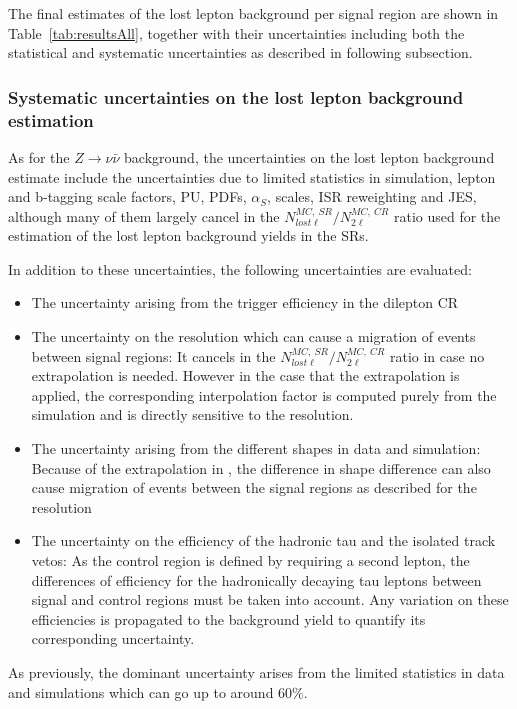 The final estimates of the lost lepton background per signal region are shown in Table~\ref{tab:resultsAll}, together with their uncertainties including both the statistical and systematic uncertainties as described in following subsection.

\subsubsection{Systematic uncertainties on the lost lepton background estimation}

As for the $Z \to \nu \bar{\nu}$ background, the uncertainties on the lost lepton background estimate include the uncertainties due to limited statistics in simulation, lepton and b-tagging scale factors, PU,  PDFs, $\alpha_{S}$, scales, ISR reweighting and JES, although many of them largely cancel in the $N^{MC,~SR}_{lost \ell}/ N^{MC,~CR}_{2\ell}$ ratio used for the estimation of the lost lepton background yields in the SRs.

In addition to these uncertainties, the following uncertainties are evaluated:
\begin{itemize} 
\item The uncertainty arising from the trigger efficiency in the dilepton CR
\item The uncertainty on the \MET resolution which can cause a migration of events between signal regions: It cancels in the $N^{MC,~SR}_{lost \ell}/ N^{MC,~CR}_{2\ell}$ ratio in case no \MET extrapolation is needed. However in the case that the \MET extrapolation is applied, the corresponding interpolation factor is computed purely from the simulation and is directly sensitive to the \MET resolution.
\item The uncertainty arising from the different \MET shapes in data and simulation: Because of the extrapolation in \MET, the difference in \MET shape difference can also cause migration of events between the signal regions as described for the \MET resolution
\item The uncertainty on the efficiency of the hadronic tau and the isolated track vetos: As the control region is defined by requiring a second lepton, the differences of efficiency for the hadronically decaying tau leptons between signal and control regions must be taken into account. Any variation on these  efficiencies is propagated to the background yield to quantify its corresponding uncertainty.
\end{itemize}

As previously, the dominant uncertainty arises from the limited statistics in data and simulations which can go up to around 60\%.

